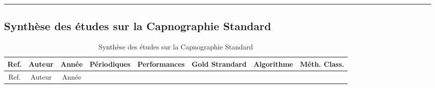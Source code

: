 \documentclass[12pt,]{article}
\begin{document}
\newpage
\begin{landscape}

\begin{center}\rule{0.5\linewidth}{0.5pt}\end{center}

\hypertarget{synthuxe8se-des-uxe9tudes-sur-la-capnographie-standard-1}{%
\subsection{Synthèse des études sur la Capnographie
Standard}\label{synthuxe8se-des-uxe9tudes-sur-la-capnographie-standard-1}}

\begin{longtable}[]{@{}ccccrrrr@{}}
\caption{Synthèse des études sur la Capnographie
Standard}\tabularnewline
\toprule
\begin{minipage}[b]{0.15\columnwidth}\centering
Ref.\strut
\end{minipage} & \begin{minipage}[b]{0.10\columnwidth}\centering
Auteur\strut
\end{minipage} & \begin{minipage}[b]{0.08\columnwidth}\centering
Année\strut
\end{minipage} & \begin{minipage}[b]{0.11\columnwidth}\centering
Périodiques\strut
\end{minipage} & \begin{minipage}[b]{0.10\columnwidth}\raggedleft
Performances\strut
\end{minipage} & \begin{minipage}[b]{0.10\columnwidth}\raggedleft
Gold Strandard\strut
\end{minipage} & \begin{minipage}[b]{0.07\columnwidth}\raggedleft
Algorithme\strut
\end{minipage} & \begin{minipage}[b]{0.08\columnwidth}\raggedleft
Méth. Class.\strut
\end{minipage}\tabularnewline
\midrule
\endfirsthead
\toprule
\begin{minipage}[b]{0.15\columnwidth}\centering
Ref.\strut
\end{minipage} & \begin{minipage}[b]{0.10\columnwidth}\centering
Auteur\strut
\end{minipage} & \begin{minipage}[b]{0.08\columnwidth}\centering
Année\strut
\end{minipage} & \begin{minipage}[b]{0.11\columnwidth}\centering

\end{minipage}
\end{longtable}
\end{landscape}
\end{document}
